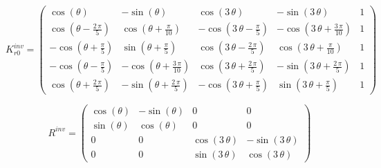 
\begin{equation}
    K_{r0}^{inv}=\left(\begin{array}{ccccc}
\cos \left(\theta \right) & -\sin \left(\theta \right) & \cos \left(3\,\theta \right) & -\sin \left(3\,\theta \right) & 1\\
\cos \left(\theta -\frac{2\,\pi }{5}\right) & \cos \left(\theta +\frac{\pi }{10}\right) & -\cos \left(3\,\theta -\frac{\pi }{5}\right) & -\cos \left(3\,\theta +\frac{3\,\pi }{10}\right) & 1\\
-\cos \left(\theta +\frac{\pi }{5}\right) & \sin \left(\theta +\frac{\pi }{5}\right) & \cos \left(3\,\theta -\frac{2\,\pi }{5}\right) & \cos \left(3\,\theta +\frac{\pi }{10}\right) & 1\\
-\cos \left(\theta -\frac{\pi }{5}\right) & -\cos \left(\theta +\frac{3\,\pi }{10}\right) & \cos \left(3\,\theta +\frac{2\,\pi }{5}\right) & -\sin \left(3\,\theta +\frac{2\,\pi }{5}\right) & 1\\
\cos \left(\theta +\frac{2\,\pi }{5}\right) & -\sin \left(\theta +\frac{2\,\pi }{5}\right) & -\cos \left(3\,\theta +\frac{\pi }{5}\right) & \sin \left(3\,\theta +\frac{\pi }{5}\right) & 1
\end{array}\right)
\end{equation}

\begin{equation}
    R^{inv}=\left(\begin{array}{cccc}
\cos \left(\theta \right) & -\sin \left(\theta \right) & 0 & 0\\
\sin \left(\theta \right) & \cos \left(\theta \right) & 0 & 0\\
0 & 0 & \cos \left(3\,\theta \right) & -\sin \left(3\,\theta \right)\\
0 & 0 & \sin \left(3\,\theta \right) & \cos \left(3\,\theta \right)
\end{array}\right)
\end{equation}
